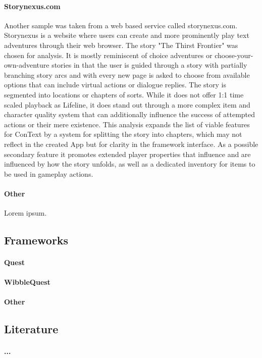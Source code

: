 \paragraph{Storynexus.com}
Another sample was taken from a web based service called storynexus.com. Storynexus is a website where users can create and more prominently play text adventures through their web browser. The story "The Thirst Frontier" was chosen for analysis. It is mostly reminiscent of choice adventures or choose-your-own-adventure stories in that the user is guided through a story with partially branching story arcs and with every new page is asked to choose from available options that can include virtual actions or dialogue replies. The story is segmented into locations or chapters of sorts. While it does not offer 1:1 time scaled playback as Lifeline, it does stand out through a more complex item and character quality system that can additionally influence the success of attempted actions or their mere existence. 
This analysis expands the list of viable features for ConText by a system for splitting the story into chapters, which may not reflect in the created App but for clarity in the framework interface. As a possible secondary feature it promotes extended player properties that influence and are influenced by how the story unfolds, as well as a dedicated inventory for items to be used in gameplay actions. 
\paragraph{Other}
Lorem ipsum.

\subsection{Frameworks}
\paragraph{Quest}
\paragraph{WibbleQuest}
\paragraph{Other}

\subsection{Literature}
\paragraph{...}
